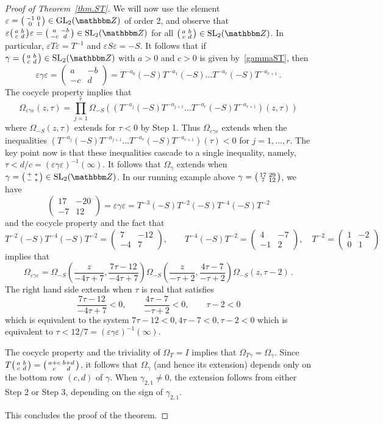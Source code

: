 \documentclass[12pt,reqno]{amsart}
\theoremstyle{definition}
\def\BZ{\mathbbm Z}
\def\SL{\mathrm{SL}}
\def\ve{\varepsilon}
\def\be{\begin{equation}}
\def\ee{\end{equation}}
\def\GL{\mathrm{GL}}
\def\Om{\Omega}
\def\sma#1#2#3#4{\bigl(\smallmatrix#1&#2\\#3&#4\endsmallmatrix\bigr)} %
\def\mat#1#2#3#4{\begin{pmatrix}#1&#2\\#3&#4\end{pmatrix}} %
\begin{document}
\begin{proof}[Proof of Theorem~\ref{thm.ST}]
  We will now use the element $\ve=\sma {-1}001 \in \GL_2(\BZ)$ of order
  2, and observe that $\ve \sma abcd \ve = \sma a{-b}{-c}d \in \SL_2(\BZ)$
  for all $\sma abcd \in \SL_2(\BZ)$. In particular, $\ve T \ve = T^{-1}$
  and $\ve S \ve = -S$. It follows that if $\gamma=\sma abcd \in \SL_2(\BZ)$
  with $a>0$ and $c>0$ is given by~\eqref{gammaST}, then
  \be
  \label{egammaST}
  \ve\gamma\ve = \begin{pmatrix} a & -b \\ -c & d \end{pmatrix}=
    T^{-a_0} (-S) T^{-a_1} (-S) \dots T^{-a_r} (-S) T^{-a_{r+1}} \,.
  \ee
  The cocycle property implies that
  \be
  \label{OmSTe}
  \Om_{\ve\gamma\ve}(z,\tau) = \prod_{j=1}^r
  \Om_{-S}( (T^{-a_j} (-S) T^{-a_{j+1}} \dots T^{-a_r} (-S) T^{-a_{r+1}})(z,\tau))
  \ee
  where $\Om_{-S}(z,\tau)$ extends for $\tau<0$ by Step 1. Thus
  $\Om_{\ve\gamma\ve}$ extends when the inequalities 
  $(T^{-a_j} (-S) T^{-a_{j+1}} \dots T^{-a_r} (-S) T^{-a_{r+1}})(\tau)<0$
  for $j=1,\dots,r$. The key point now is that these inequalities cascade to
  a single inequality, namely, $\tau < d/c=(\ve\gamma\ve)^{-1}(\infty)$.
  It follows that $\Om_\gamma$ extends when $\gamma = \sma +*{-}* \in \SL_2(\BZ)$.
  In our running example above $\gamma=\sma {17}{29}{7}{12}$, we have
  \be
  \begin{pmatrix} 17 & -20 \\ -7 & 12 \end{pmatrix} =
  \ve \gamma \ve = T^{-3} (-S) T^{-2} (-S) T^{-4} (-S) T^{-2}
  \ee
  and the cocycle property and the fact that 
  $$
  T^{-2} (-S) T^{-4} (-S) T^{-2}=\mat 7{-12}{-4}7, \qquad
 T^{-4} (-S) T^{-2}=\mat 4{-7}{-1}2, \quad
 T^{-2}=\mat 1{-2}{0}1
 $$
 implies that
  \be
  \Om_{\ve \gamma \ve} =
  \Om_{-S}\left(\frac{z}{-4\tau+7}, \frac{7\tau-12}{-4\tau+7}\right)
  \Om_{-S}\left(\frac{z}{-\tau+2}, \frac{4\tau-7}{-\tau+2}\right)
  \Om_{-S}(z, \tau-2) \,.
  \ee
  The right hand side extends when $\tau$ is real that satisfies
  $$
  \frac{7\tau-12}{-4\tau+7} <0, \qquad \frac{4\tau-7}{-\tau+2} <0, \qquad
  \tau-2 <0
$$
which is equivalent to the system $7\tau-12<0, 4\tau-7<0, \tau-2<0$ which
is equivalent to $\tau < 12/7=(\ve\gamma\ve)^{-1}(\infty)$.

  The cocycle property and the triviality of $\Om_T=I$ implies that 
$\Om_{T \gamma}=\Om_\gamma$. Since $T \sma abcd =\sma {a+c}{b+d}cd$, it follows
that $\Om_\gamma$ (and hence its extension) depends only on the bottom row
$(c,d)$ of $\gamma$. When $\gamma_{2,1} \neq 0$, the extension follows from
either Step 2 or Step 3, depending on the sign of $\gamma_{2,1}$.

This concludes the proof of the theorem.  
\end{proof}
\end{document}
